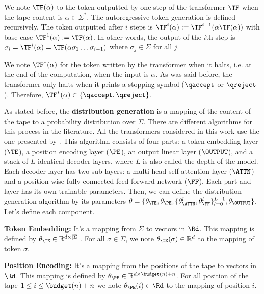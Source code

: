 We note $\TF(\alpha)$ to the token outputted by one step of the transformer $\TF$ when the tape content is $\alpha \in \Sigma^*$.
The autoregressive token generation is defined recursively. The token outputted after $i$ steps is $\TF^{i}(\alpha) := \TF^{i-1}(\alpha \TF(\alpha))$ with base case $\TF^1(\alpha) := \TF(\alpha)$.
In other words, the output of the $i$th step is $\sigma_{i} = \TF^{i}(\alpha) = \TF(\alpha\sigma_{1}\dots\sigma_{i-1})$ where $\sigma_j \in \Sigma$ for all $j$.

We note $\TF^*(\alpha)$ for the token written by the transformer when it halts, i.e. at the end of the computation, when the input is $\alpha$.
As was said before, the transformer only halts when it prints a stopping symbol ($\qaccept$ or $\qreject$).
Therefore, $\TF^*(\alpha) \in \{\qaccept, \qreject\}$.




\medskip


As stated before, the \textbf{distribution generation} is a mapping of the content of the tape to a probability distribution over $\Sigma$.
There are different algorithms for this process in the literature.
All the transformers considered in this work use the one presented by \cite{toyota}. 
This algorithm consists of four parts: a token embedding layer ($\TE$), a position encoding layer ($\PE$), an output linear layer ($\OUTPUT$), and a stack of $L$ identical decoder layers, where $L$ is also called the depth of the model. 
Each decoder layer has two sub-layers: a multi-head self-attention layer ($\ATTN$) and a position-wise fully-connected feed-forward network ($\FF$). 
Each part and layer has its own trainable parameters.
Then, we can define the distribution generation algorithm by its parameters $\theta = \{\theta_\TE, \theta_\PE, \{\theta_\ATTN^{l}, \theta_\FF^{l}\}_{l=0}^{L-1}, \theta_\OUTPUT\}$. Let's define each component.

\textbf{Token Embedding:} It's a mapping from $\Sigma$ to vectors in $\Rd$. This mapping is defined by $\theta_{\TE} \in \mathbb{R}^{d \times | \Sigma |}$. For all $\sigma \in \Sigma$, we note $\theta_{\TE}(\sigma) \in \mathbb{R}^d$ to the mapping of token $\sigma$.

\textbf{Position Encoding:} It's a mapping from the positions of the tape to vectors in $\Rd$. This mapping is defined by $\theta_{\PE} \in \mathbb{R}^{d \times \budget(n) + n}$. For all position of the tape $1 \leq i \leq \budget(n) + n$ we note $\theta_{\PE}(i) \in \Rd$ to the mapping of position $i$.

